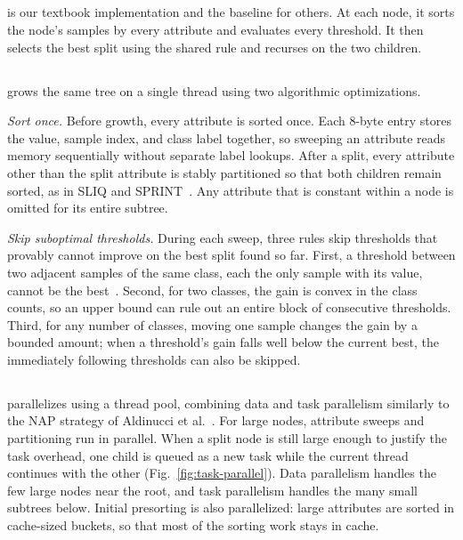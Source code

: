 \subsection{\ImplSerialBase}
\label{sec:impl-simple}

\ImplSerialBase{} is our textbook implementation and the baseline for others. At each node, it sorts the node's samples by every attribute and evaluates every threshold. It then selects the best split using the shared rule and recurses on the two children. 

\subsection{\ImplSerialOpt}
\label{sec:impl-serial}

\ImplSerialOpt{} grows the same tree on a single thread using two algorithmic optimizations.

\emph{Sort once.} Before growth, every attribute is sorted once. Each 8-byte entry stores the value, sample index, and class label together, so sweeping an attribute reads memory sequentially without separate label lookups. After a split, every attribute other than the split attribute is stably partitioned so that both children remain sorted, as in SLIQ and SPRINT~\cite{mehta1996sliq,shafer1996sprint}. Any attribute that is constant within a node is omitted for its entire subtree.

\emph{Skip suboptimal thresholds.} During each sweep, three rules skip thresholds that provably cannot improve on the best split found so far. First, a threshold between two adjacent samples of the same class, each the only sample with its value, cannot be the best~\cite{fayyad1992continuous}. Second, for two classes, the gain is convex in the class counts, so an upper bound can rule out an entire block of consecutive thresholds. Third, for any number of classes, moving one sample changes the gain by a bounded amount; when a threshold's gain falls well below the current best, the immediately following thresholds can also be skipped.

\subsection{\ImplParallel}
\label{sec:impl-parallel}

\ImplParallel{} parallelizes \ImplSerialOpt{} using a thread pool, combining data and task parallelism similarly to the NAP strategy of Aldinucci et al.~\cite{aldinucci2014fastflow}. For large nodes, attribute sweeps and partitioning run in parallel. When a split node is still large enough to justify the task overhead, one child is queued as a new task while the current thread continues with the other (Fig.~\ref{fig:task-parallel}). Data parallelism handles the few large nodes near the root, and task parallelism handles the many small subtrees below. Initial presorting is also parallelized: large attributes are sorted in cache-sized buckets, so that most of the sorting work stays in cache.

